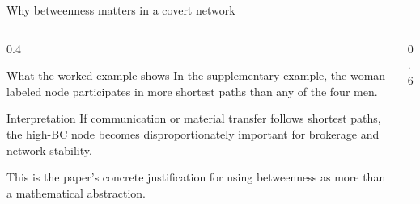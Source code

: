 \begin{frame}{Why betweenness matters in a covert network}
  \small
  \begin{columns}[T,onlytextwidth]
    \begin{column}{0.4\textwidth}
      \begin{block}{What the worked example shows}
        In the supplementary example, the woman-labeled node participates in more shortest paths than any of the four men.
      \end{block}

      \begin{exampleblock}{Interpretation}
        If communication or material transfer follows shortest paths, the high-BC node becomes disproportionately important for brokerage and network stability.
      \end{exampleblock}

      {\footnotesize\color{PresTwoSecondary}
      This is the paper's concrete justification for using betweenness as more than a mathematical abstraction.}
    \end{column}

    \begin{column}{0.6\textwidth}
    \end{column}
  \end{columns}

\end{frame}
